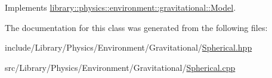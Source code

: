 Implements \hyperlink{classlibrary_1_1physics_1_1environment_1_1gravitational_1_1_model_aac2962e4bf0fddb4d80c21038f1b24e2}{library\+::physics\+::environment\+::gravitational\+::\+Model}.



The documentation for this class was generated from the following files\+:\begin{DoxyCompactItemize}
\item 
include/\+Library/\+Physics/\+Environment/\+Gravitational/\hyperlink{_spherical_8hpp}{Spherical.\+hpp}\item 
src/\+Library/\+Physics/\+Environment/\+Gravitational/\hyperlink{_spherical_8cpp}{Spherical.\+cpp}\end{DoxyCompactItemize}
